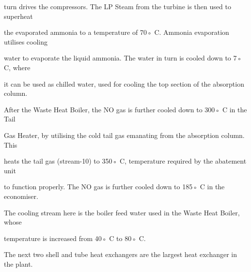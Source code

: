 \documentclass[a4paper,portrait,12pt]{article}
\begin{document}
\begin{flushleft}
turn drives the compressors. The LP Steam from the turbine is then used to superheat
\end{flushleft}


\begin{flushleft}
the evaporated ammonia to a temperature of 70◦ C. Ammonia evaporation utilises cooling
\end{flushleft}


\begin{flushleft}
water to evaporate the liquid ammonia. The water in turn is cooled down to 7◦ C, where
\end{flushleft}


\begin{flushleft}
it can be used as chilled water, used for cooling the top section of the absorption column.
\end{flushleft}


\begin{flushleft}
After the Waste Heat Boiler, the NO gas is further cooled down to 300◦ C in the Tail
\end{flushleft}


\begin{flushleft}
Gas Heater, by utilising the cold tail gas emanating from the absorption column. This
\end{flushleft}


\begin{flushleft}
heats the tail gas (stream-10) to 350◦ C, temperature required by the abatement unit
\end{flushleft}


\begin{flushleft}
to function properly. The NO gas is further cooled down to 185◦ C in the economiser.
\end{flushleft}


\begin{flushleft}
The cooling stream here is the boiler feed water used in the Waste Heat Boiler, whose
\end{flushleft}


\begin{flushleft}
temperature is increased from 40◦ C to 80◦ C.
\end{flushleft}


\begin{flushleft}
The next two shell and tube heat exchangers are the largest heat exchanger in the plant.
\end{flushleft}
\end{document}
